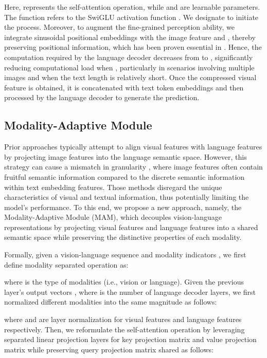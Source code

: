 \documentclass[10pt,twocolumn,letterpaper]{article}
\begin{document}
Here,  represents the self-attention operation, while  and  are learnable parameters. The function  refers to the SwiGLU activation function \cite{shazeer2020swiglu}. We designate  to initiate the process. Moreover, to augment the fine-grained perception ability, we integrate sinusoidal positional embeddings with the image feature  and , thereby preserving positional information, which has been proven essential in \cite{carion2020detr}. Hence, the computation required by the language decoder decreases from  to , significantly reducing computational load when , particularly in scenarios involving multiple images and when the text length  is relatively short. Once the compressed visual feature is obtained, it is concatenated with text token embeddings and then processed by the language decoder to generate the prediction.

\subsection{Modality-Adaptive Module}\label{sec:module}
Prior approaches \cite{Zhu2023MiniGPT4, Liu2023Llava, Dai2023InstructBLIP, ye2023mplugowl} typically attempt to align visual features with language features by projecting image features into the language semantic space. However, this strategy can cause a mismatch in granularity , where image features often contain fruitful semantic information compared to the discrete semantic information within text embedding features. Those methods disregard the unique characteristics of visual and textual information, thus potentially limiting the model's performance. To this end, we propose a new approach, namely, the Modality-Adaptive Module (MAM), which decouples vision-language representations by projecting visual features and language features into a shared semantic space while preserving the distinctive properties of each modality. 

Formally, given a vision-language sequence  and modality indicators , we first define modality separated operation  as:

where  is the type of modalities (i.e., vision or language). Given the previous layer's output vectors , where  is the number of language decoder layers, we first normalized different modalities into the same magnitude as follows:

where  and  are layer normalization \cite{ba2016layer} for visual features and language features respectively. Then, we reformulate the self-attention operation by leveraging separated linear projection layers for key projection matrix and value projection matrix while preserving query projection matrix shared as follows:
\end{document}
